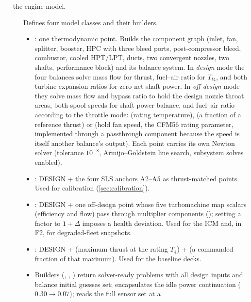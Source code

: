 \begin{description}
  \item[ --- the engine model.] Defines four model classes and their
    builders.
    \begin{itemize}
      \item {}: one thermodynamic point. Builds the component graph
        (inlet, fan, splitter, booster, HPC with three bleed ports, post-compressor bleed,
        combustor, cooled HPT/LPT, ducts, two convergent nozzles, two shafts, performance
        block) and its balance system. In \emph{design} mode the four balances solve mass flow
        for thrust, fuel--air ratio for $T_{t4}$, and both turbine expansion ratios for zero
        net shaft power. In \emph{off-design} mode they solve mass flow and bypass ratio to
        hold the design nozzle throat areas, both spool speeds for shaft power balance, and
        fuel--air ratio according to the throttle mode:  (rating temperature),
         (a fraction of a reference thrust) or  (hold fan
        speed, the CFM56 rating parameter, implemented through a passthrough component because
        the speed is itself another balance's output). Each point carries its own Newton
        solver (tolerance $10^{-8}$, Armijo--Goldstein line search, subsystem solves enabled).
      \item {}: DESIGN + the four SLS anchors A2--A5 as
        thrust-matched  points. Used for calibration
        (\cref{sec:calibration}).
      \item {}: DESIGN + one off-design point whose five turbomachine map
        scalars (efficiency and flow) pass through multiplier components
        (); setting a factor to $1+\Delta$ imposes a
        health deviation. Used for the ICM and, in F2, for degraded-fleet snapshots.
      \item {}: DESIGN +  (maximum thrust at the rating $T_4$)
        +  (a commanded fraction of that maximum). Used for the baseline decks.
      \item Builders (, ,
        ) return solver-ready problems with all design inputs and
        balance initial guesses set;  encapsulates the idle power
        continuation ($0.30\rightarrow0.07$);  reads the full sensor set at a

\end{itemize}
\end{description}
